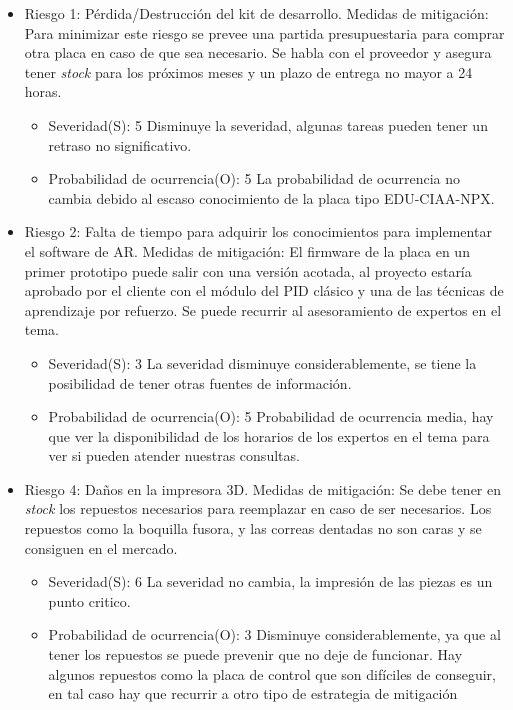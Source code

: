 \documentclass[11pt]{charter}
\begin{document}
\begin{itemize}
\item Riesgo 1: Pérdida/Destrucción	del kit de desarrollo.
	Medidas de mitigación: Para minimizar este riesgo se prevee una partida presupuestaria para comprar otra placa en caso de que sea necesario. Se habla con el proveedor y asegura tener \textit{stock} para los próximos meses y un plazo de entrega no mayor a 24 horas.
	\begin{itemize}
	\item Severidad(S): 5 Disminuye la severidad, algunas tareas pueden tener un retraso no significativo. 
	\item  Probabilidad de ocurrencia(O): 5 La probabilidad de ocurrencia no cambia debido al escaso conocimiento de la placa tipo EDU-CIAA-NPX. 
	\end{itemize}
\item Riesgo 2:  Falta de tiempo para adquirir los conocimientos
para implementar el software de AR.
	Medidas de mitigación: El firmware de la placa en un primer prototipo puede salir con una versión acotada, al proyecto estaría aprobado por el cliente con el módulo del PID clásico y una de las técnicas de aprendizaje por refuerzo. Se puede recurrir al asesoramiento de expertos en el tema.
	\begin{itemize}
	\item Severidad(S): 3 La severidad disminuye considerablemente, se tiene la posibilidad de tener otras fuentes de información.
	\item  Probabilidad de ocurrencia(O): 5 Probabilidad de ocurrencia media, hay que ver la disponibilidad de los horarios de los expertos en el tema para ver si pueden atender nuestras consultas.  
	\end{itemize} 
\item Riesgo 4: Daños en la	impresora 3D.
	Medidas de mitigación: Se debe tener en \textit{stock} los repuestos necesarios para reemplazar en caso de ser necesarios. Los repuestos como la boquilla fusora, y las correas dentadas no son caras y se consiguen en el mercado.
	\begin{itemize}
	\item Severidad(S): 6 La severidad no cambia, la impresión de las piezas es un punto critico.
	\item  Probabilidad de ocurrencia(O): 3 Disminuye considerablemente, ya que al tener los repuestos se puede prevenir que no deje de funcionar. Hay algunos repuestos como la placa de control que son difíciles de conseguir, en tal caso hay que recurrir a otro tipo de estrategia de mitigación

\end{itemize}
\end{itemize}
\end{document}
